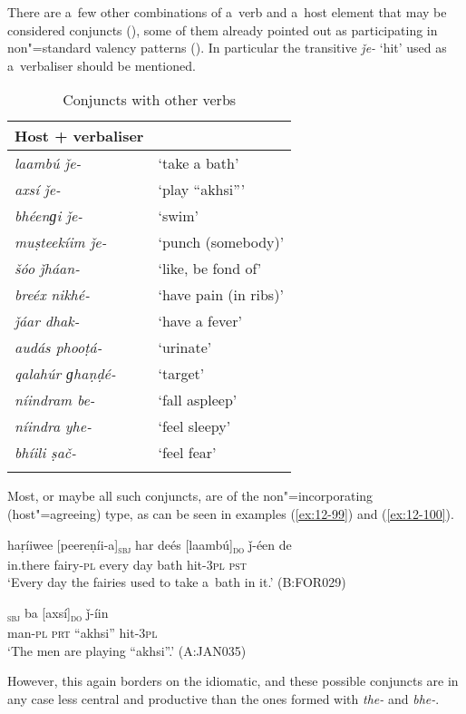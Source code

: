  There are a~few other combinations of a~verb and a~host element that may be considered conjuncts (), some of them already pointed out as participating in non"=standard valency patterns (). In particular the transitive \textit{ǰe-} `hit' used as a~verbaliser should be mentioned.


\begin{table}[ht]
\caption{Conjuncts with other verbs}
\begin{tabularx}{.75\textwidth}{ l@{\hspace{45pt}} Q }
\lspbottomrule
\textbf{Host + verbaliser} &
\\\hline
\textit{laambú ǰe-} &
`take a bath'\\
\textit{axsí ǰe-} &
`play ``akhsi'''\\
\textit{bhéenɡi ǰe-} &
`swim'\\
\textit{muṣteekíim ǰe-} &
`punch (somebody)'\\
\textit{šóo ǰháan-} &
`like, be fond of'\\
\textit{breéx nikhé-} &
`have pain (in ribs)'\\
\textit{ǰáar dhak-} &
`have a fever'\\
\textit{audás phooṭá-} &
`urinate'\\
\textit{qalahúr ɡhaṇḍé-} &
`target'\\
\textit{níindram be-} &
`fall aspleep'\\
\textit{níindra yhe-} &
`feel sleepy'\\
\textit{bhíili ṣač-} &
`feel fear'\\\lspbottomrule
\end{tabularx}
\label{tab:12-9}
\end{table}


Most, or maybe all such conjuncts, are of the non"=incorporating (host"=agreeing) type, as can be seen in examples (\ref{ex:12-99}) and (\ref{ex:12-100}). 

\begin{exe}
\ex
\label{ex:12-99}
\gll haṛíiwee [peereṇíi-a]\textsubscript{\textsc{sbj}} har deés [laambú]\textsubscript{\textsc{do}} ǰ-éen de \\
in.there fairy-\textsc{pl} every day bath hit-\textsc{3pl} \textsc{pst} \\
\glt `Every day the fairies used to take a~bath in it.' (B:FOR029)
\end{exe}
\begin{exe}
\ex
\label{ex:12-100}
\gll [míiš-a]\textsubscript{\textsc{sbj}} ba [axsí]\textsubscript{\textsc{do}} ǰ-íin  \\
man-\textsc{pl} \textsc{prt} ``akhsi'' hit-\textsc{3pl} \\
\glt `The men are playing ``akhsi''.' (A:JAN035)
\end{exe}

However, this again borders on the idiomatic, and these possible conjuncts are in any case less central and productive than the ones formed with \textit{the-} and \textit{bhe-}.